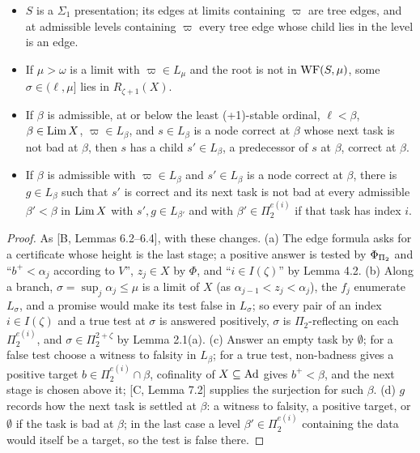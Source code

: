 \documentclass[11pt]{article}
\begin{document}
\begin{statement}
\begin{itemize}
\item[(a)] $S$ is a $\Sigma_1$ presentation; its edges at limits containing $\varpi$ are tree edges, and at admissible
  levels containing $\varpi$ every tree edge whose child lies in the level is an edge.
\item[(b)] If $\mu > \omega$ is a limit with $\varpi \in L_\mu$ and the root is not in $\mathrm{WF}(S,\mu)$, some $\sigma \in
  (\ell, \mu]$ lies in $R_{\zeta+1}(X)$.
\item[(c)] If $\beta$ is admissible, at or below the least (+1)-stable ordinal, $\ell < \beta$, $\beta \in \mathrm{Lim}\, X$, $\varpi \in L_\beta$, and $s \in
  L_\beta$ is a node correct at $\beta$ whose next task is not bad at $\beta$, then $s$ has a child $s' \in L_\beta$,
  a predecessor of $s$ at $\beta$, correct at $\beta$.
\item[(d)] If $\beta$ is admissible with $\varpi \in L_\beta$ and $s' \in L_\beta$ is a node correct at $\beta$, there is
  $g \in L_\beta$ such that $s'$ is correct and its next task is not bad at every admissible $\beta' < \beta$ in $\mathrm{Lim}\,
  X$ with $s', g \in L_{\beta'}$ and with $\beta' \in \Pi_2^{e(i)}$ if that task has index $i$.
\end{itemize}
\end{statement}

\begin{proof}
As [B, Lemmas 6.2--6.4], with these changes. (a) The edge formula asks for a certificate whose height is the last
stage; a positive answer is tested by $\Phi_{\Pi_2}$ and ``$b^+ < \alpha_j$ according to $V$'', $z_j \in X$ by $\Phi$, and
``$i \in I(\zeta)$'' by Lemma 4.2. (b) Along a branch, $\sigma = \sup_j \alpha_j \le \mu$ is a limit of $X$ (as
$\alpha_{j-1} < z_j < \alpha_j$), the $f_j$ enumerate $L_\sigma$, and a promise would make its test false in
$L_\sigma$; so every pair of an index $i \in I(\zeta)$ and a true test at $\sigma$ is answered positively, $\sigma$ is
$\Pi_2$-reflecting on each $\Pi_2^{e(i)}$, and $\sigma \in \Pi_2^{2+\zeta}$ by Lemma 2.1(a). (c) Answer an empty task by
$\emptyset$; for a false test choose a witness to falsity in $L_\beta$; for a true test, non-badness gives a positive
target $b \in \Pi_2^{e(i)} \cap \beta$, cofinality of $X \subseteq \mathrm{Ad}$ gives $b^+ < \beta$, and the next stage is chosen above
it; [C, Lemma 7.2] supplies the surjection for such $\beta$. (d) $g$ records how the next task is settled at $\beta$: a witness to
falsity, a positive target, or $\emptyset$ if the task is bad at $\beta$; in the last case a level $\beta' \in \Pi_2^{e(i)}$
containing the data would itself be a target, so the test is false there.
\end{proof}
\end{document}
